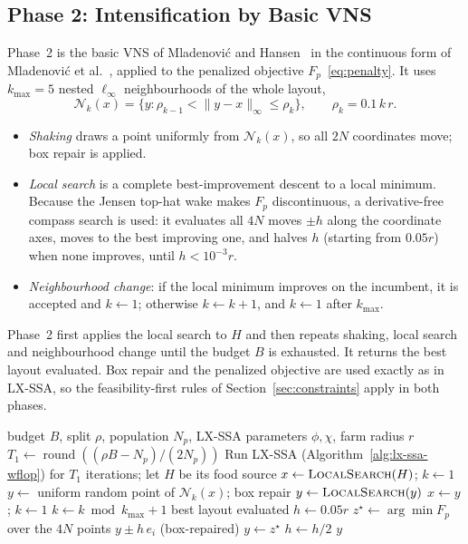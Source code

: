 \subsection{Phase 2: Intensification by Basic VNS}
Phase~2 is the basic VNS of Mladenovi\'c and Hansen~\cite{Mladenovic1997,Hansen2001} in the continuous form of Mladenovi\'c et al.~\cite{Mladenovic2008}, applied to the penalized objective $F_p$~\eqref{eq:penalty}. It uses $k_{\max}=5$ nested $\ell_\infty$ neighbourhoods of the whole layout,
\[
\mathcal N_k(x)=\{y:\rho_{k-1}<\lVert y-x\rVert_\infty\le\rho_k\},\qquad \rho_k=0.1\,k\,r .
\]
\begin{itemize}
\item \emph{Shaking} draws a point uniformly from $\mathcal N_k(x)$, so all $2N$ coordinates move; box repair is applied.
\item \emph{Local search} is a complete best-improvement descent to a local minimum. Because the Jensen top-hat wake makes $F_p$ discontinuous, a derivative-free compass search is used: it evaluates all $4N$ moves $\pm h$ along the coordinate axes, moves to the best improving one, and halves $h$ (starting from $0.05r$) when none improves, until $h<10^{-3}r$.
\item \emph{Neighbourhood change}: if the local minimum improves on the incumbent, it is accepted and $k\gets1$; otherwise $k\gets k+1$, and $k\gets1$ after $k_{\max}$.
\end{itemize}
Phase~2 first applies the local search to $H$ and then repeats shaking, local search and neighbourhood change until the budget $B$ is exhausted. It returns the best layout evaluated. Box repair and the penalized objective are used exactly as in LX-SSA, so the feasibility-first rules of Section~\ref{sec:constraints} apply in both phases.

\begin{algorithm}
\caption{Hybrid LX-SSA-VNS for a prescribed turbine count $N$}
\label{alg:hybrid}
\begin{algorithmic}[1]
\Require budget $B$, split $\rho$, population $N_p$, LX-SSA parameters $\phi,\chi$, farm radius $r$
\State $T_1\gets\operatorname{round}((\rho B-N_p)/(2N_p))$
\State Run LX-SSA (Algorithm~\ref{alg:lx-ssa-wflop}) for $T_1$ iterations; let $H$ be its food source
\State $x\gets\textsc{LocalSearch}(H)$; $k\gets1$
    \State $y\gets$ uniform random point of $\mathcal N_k(x)$; box repair
    \State $y\gets\textsc{LocalSearch}(y)$
        \State $x\gets y$; $k\gets1$
    \Else
        \State $k\gets k\bmod k_{\max}+1$
    \EndIf
\EndWhile
\State \Return best layout evaluated
\Statex
{} 
    \State $h\gets0.05r$
        \State $z^\star\gets\arg\min F_p$ over the $4N$ points $y\pm h\,e_i$ (box-repaired)
         \State $y\gets z^\star$ \Else \State $h\gets h/2$ \EndIf
    \EndWhile
    \State \Return $y$
\EndFunction
\end{algorithmic}
\end{algorithm}

